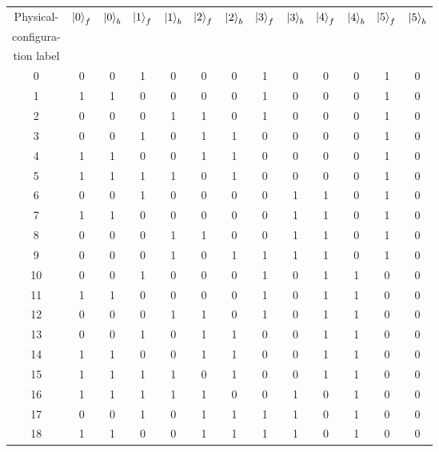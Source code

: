 \documentclass[a4paper,onecolumn,11pt,accepted=2024-10-11]{quantumarticle}
\begin{document}
\begin{table}[ht!]
    \centering
    \begin{tabular}{|c||*{12}{c|}}\hline
Physical- & \multirow{3}{*}{$\ket{0}_{f}$} & \multirow{3}{*}{$\ket{0}_{b}$} & \multirow{3}{*}{$\ket{1}_{f}$} & \multirow{3}{*}{$\ket{1}_{b}$} & \multirow{3}{*}{$\ket{2}_{f}$} & \multirow{3}{*}{$\ket{2}_{b}$} & \multirow{3}{*}{$\ket{3}_{f}$} & \multirow{3}{*}{$\ket{3}_{b}$} & \multirow{3}{*}{$\ket{4}_{f}$} & \multirow{3}{*}{$\ket{4}_{b}$} & \multirow{3}{*}{$\ket{5}_{f}$} & \multirow{3}{*}{$\ket{5}_{b}$} \\
configura- & & & & & & & & & & & & \\
tion label & & & & & & & & & & & & \\
\hline
0 & 0 & 0 & 1 & 0 & 0 & 0 & 1 & 0 & 0 & 0 & 1 & 0 \\ \hline
1 & 1 & 1 & 0 & 0 & 0 & 0 & 1 & 0 & 0 & 0 & 1 & 0 \\ \hline
2 & 0 & 0 & 0 & 1 & 1 & 0 & 1 & 0 & 0 & 0 & 1 & 0 \\ \hline
3 & 0 & 0 & 1 & 0 & 1 & 1 & 0 & 0 & 0 & 0 & 1 & 0 \\ \hline
4 & 1 & 1 & 0 & 0 & 1 & 1 & 0 & 0 & 0 & 0 & 1 & 0 \\ \hline
5 & 1 & 1 & 1 & 1 & 0 & 1 & 0 & 0 & 0 & 0 & 1 & 0 \\ \hline
6 & 0 & 0 & 1 & 0 & 0 & 0 & 0 & 1 & 1 & 0 & 1 & 0 \\ \hline
7 & 1 & 1 & 0 & 0 & 0 & 0 & 0 & 1 & 1 & 0 & 1 & 0 \\ \hline
8 & 0 & 0 & 0 & 1 & 1 & 0 & 0 & 1 & 1 & 0 & 1 & 0 \\ \hline
9 & 0 & 0 & 0 & 1 & 0 & 1 & 1 & 1 & 1 & 0 & 1 & 0 \\ \hline
10 & 0 & 0 & 1 & 0 & 0 & 0 & 1 & 0 & 1 & 1 & 0 & 0 \\ \hline
11 & 1 & 1 & 0 & 0 & 0 & 0 & 1 & 0 & 1 & 1 & 0 & 0 \\ \hline
12 & 0 & 0 & 0 & 1 & 1 & 0 & 1 & 0 & 1 & 1 & 0 & 0 \\ \hline
13 & 0 & 0 & 1 & 0 & 1 & 1 & 0 & 0 & 1 & 1 & 0 & 0 \\ \hline
14 & 1 & 1 & 0 & 0 & 1 & 1 & 0 & 0 & 1 & 1 & 0 & 0 \\ \hline
15 & 1 & 1 & 1 & 1 & 0 & 1 & 0 & 0 & 1 & 1 & 0 & 0 \\ \hline
16 & 1 & 1 & 1 & 1 & 1 & 0 & 0 & 1 & 0 & 1 & 0 & 0 \\ \hline
17 & 0 & 0 & 1 & 0 & 1 & 1 & 1 & 1 & 0 & 1 & 0 & 0 \\ \hline
18 & 1 & 1 & 0 & 0 & 1 & 1 & 1 & 1 & 0 & 1 & 0 & 0 \\ \hline

\end{tabular}
\end{table}
\end{document}
